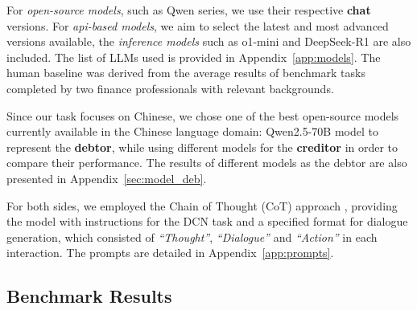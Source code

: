 For \textit{open-source models}, such as Qwen series, we use their respective \textbf{chat} versions. For \textit{api-based models}, we aim to select the latest and most advanced versions available, the \textit{inference models} such as o1-mini \citep{openai2025o1} and DeepSeek-R1 \citep{deepseekai2025deepseekr1incentivizingreasoningcapability} are also included. The list of LLMs used is provided in Appendix~\ref{app:models}. The human baseline was derived from the average results of benchmark tasks completed by two finance professionals with relevant backgrounds.

Since our task focuses on Chinese, we chose one of the best open-source models currently available in the Chinese language domain: Qwen2.5-70B model to represent the \textbf{debtor}, while using different models for the \textbf{creditor} in order to compare their performance. The results of different models as the debtor are also presented in Appendix~\ref{sec:model_deb}. 

For both sides, we employed the Chain of Thought (CoT) approach \citep{wei2023chainofthoughtpromptingelicitsreasoning}, providing the model with instructions for the DCN task and a specified format for dialogue generation, which consisted of \textit{“Thought”}, \textit{“Dialogue”} and \textit{“Action” }in each interaction. The prompts are detailed in Appendix~\ref{app:prompts}.

\subsection{Benchmark Results}





